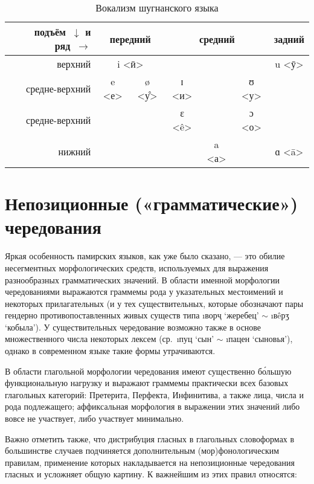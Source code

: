 \begin{table}
 \centering
 \caption{Вокализм шугнанского языка}
 \smallskip
 \label{tab:morphon1}
 \begin{tabular}{r|cccccc} \toprule
 подъём~$\downarrow$ и ряд~$\rightarrow$ & \multicolumn{2}{c}{передний} & \multicolumn{3}{c}{средний} & задний \\ \midrule
 верхний & \multicolumn{2}{c}{i <ӣ>} & & & & u <ӯ>
 \\
 средне-верхний & e <е> & ø <у̊> & ɪ <и> & & ʊ <у> & \\
 средне-верхний & & & ɛ <ê> & & ɔ <о> & \\
 нижний & & & & a <а> & & ɑ <ā> \\ \bottomrule
 \end{tabular}
\end{table}

\section{Непозиционные («грамматические») чередования} \label{morphon-nepozic}

Яркая особенность памирских языков, как уже было сказано, — это обилие несегментных морфологических средств, используемых для выражения разнообразных грамматических значений. В области именной морфологии чередованиями выражаются граммемы рода у указательных местоимений и некоторых прилагательных (и у тех существительных, которые обозначают пары гендерно противопоставленных живых существ типа \i{ворҷ} ‘жеребец’ $\sim$ \i{вêрӡ} ‘кобыла’). У существительных чередование возможно также в основе множественного числа некоторых лексем (ср.~\i{пуц} ‘сын’ $\sim$ \i{пацен} ‘сыновья’), однако в современном языке такие формы утрачиваются.

В области глагольной морфологии чередования имеют существенно бо́льшую функциональную нагрузку и выражают граммемы практически всех базовых глагольных категорий: Претерита, Перфекта, Инфинитива, а также лица, числа и рода подлежащего; аффиксальная морфология в выражении этих значений либо вовсе не участвует, либо участвует минимально.

Важно отметить также, что дистрибуция гласных в глагольных словоформах в большинстве случаев подчиняется дополнительным (мор)фонологическим правилам, применение которых накладывается на непозиционные чередования гласных и усложняет общую картину. К важнейшим из этих правил относятся:

